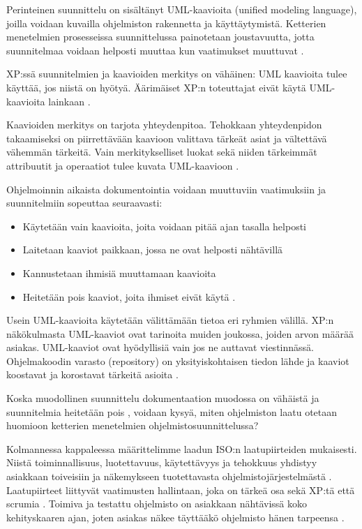 \documentclass[finnish]{tktltiki2}
\theoremstyle{definition}
\theoremstyle{remark}
\begin{document}
Perinteinen suunnittelu on sisältänyt UML-kaavioita (unified modeling language), joilla voidaan kuvailla ohjelmiston rakennetta ja käyttäytymistä. Ketterien menetelmien prosesseissa suunnittelussa painotetaan joustavuutta, jotta suunnitelmaa voidaan helposti muuttaa kun vaatimukset muuttuvat \cite{FOW01b}.

XP:ssä suunnitelmien ja kaavioiden merkitys on vähäinen: UML kaavioita tulee käyttää, jos niistä on hyötyä. Äärimäiset XP:n toteuttajat eivät käytä UML-kaavioita lainkaan \cite{FOW01b}.

Kaavioiden merkitys on tarjota yhteydenpitoa. Tehokkaan yhteydenpidon takaamiseksi on piirrettävään kaavioon valittava tärkeät asiat ja vältettävä vähemmän tärkeitä. Vain merkitykselliset luokat sekä niiden tärkeimmät attribuutit ja operaatiot tulee kuvata UML-kaavioon \cite{FOW01b}.

Ohjelmoinnin aikaista dokumentointia voidaan muuttuviin vaatimuksiin ja suunnitelmiin sopeuttaa seuraavasti:

\begin{itemize}
 \item Käytetään vain kaavioita, joita voidaan pitää ajan tasalla helposti 
 \item Laitetaan kaaviot paikkaan, jossa ne ovat helposti nähtävillä
 \item Kannustetaan ihmisiä muuttamaan kaavioita
 \item Heitetään pois kaaviot, joita ihmiset eivät käytä \cite{FOW01b}.
\end{itemize}

Usein UML-kaavioita käytetään välittämään tietoa eri ryhmien välillä. XP:n näkökulmasta UML-kaaviot ovat tarinoita muiden joukossa, joiden arvon määrää asiakas. UML-kaaviot ovat hyödyllisiä vain jos ne auttavat viestinnässä. Ohjelmakoodin varasto (repository) on yksityiskohtaisen tiedon lähde ja kaaviot koostavat ja korostavat tärkeitä asioita \cite{FOW01b}.

Koska muodollinen suunnittelu dokumentaation muodossa on vähäistä ja suunnitelmia heitetään pois \cite{FOW01b}, voidaan kysyä, miten ohjelmiston laatu otetaan huomioon ketterien menetelmien ohjelmistosuunnittelussa?

Kolmannessa kappaleessa määrittelimme laadun ISO:n laatupiirteiden mukaisesti. Niistä toiminnallisuus, luotettavuus, käytettävyys ja tehokkuus yhdistyy asiakkaan toiveisiin ja näkemykseen tuotettavasta ohjelmisto\-järjestelmästä \cite{KIP96}. Laatupiirteet liittyvät vaatimusten hallintaan, joka on tärkeä osa sekä XP:tä \cite{BEC99} että scrumia \cite{SCH09}. Toimiva ja testattu ohjelmisto on asiakkaan nähtävissä koko kehityskaaren ajan, joten asiakas näkee täyttääkö ohjelmisto hänen tarpeensa \cite{BEC99}.
\end{document}
